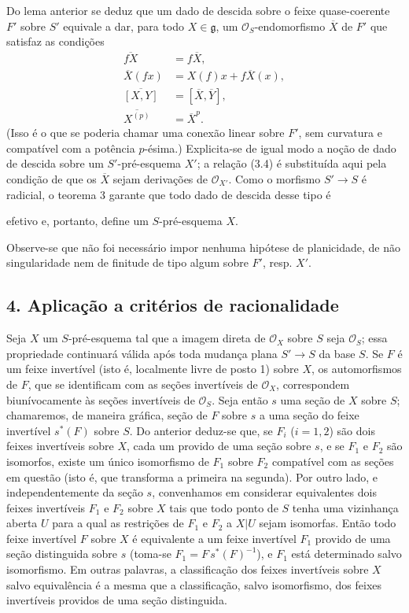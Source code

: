 Do lema anterior se deduz que um dado de descida sobre o feixe
quase-coerente $F'$ sobre $S'$ equivale a dar, para todo $X\in\mathfrak g$, um
$\mathcal O_S$-endomorfismo $\overline X$ de $F'$ que satisfaz as condições
\begin{align}
  \overline{fX}&=f\overline X, \tag{3.7}\\
  \overline X(fx)&=X(f)x+f\overline X(x), \tag{3.8}\\
  \overline{[X,Y]}&=[\overline X,\overline Y], \tag{3.9}\\
  \overline{X^{(p)}}&=\overline X^p. \tag{3.10}
\end{align}
(Isso é o que se poderia chamar uma conexão linear sobre $F'$, sem curvatura
e compatível com a potência $p$-ésima.) Explicita-se de igual modo a noção
de dado de descida sobre um $S'$-pré-esquema $X'$; a relação (3.4) é
substituída aqui pela condição de que os $\overline X$ sejam derivações de
$\mathcal O_{X'}$. Como o morfismo $S'\longrightarrow S$ é radicial, o
teorema 3 garante que todo dado de descida desse tipo é

efetivo e, portanto, define um $S$-pré-esquema $X$.

Observe-se que não foi necessário impor nenhuma hipótese de planicidade, de
não singularidade nem de finitude de tipo algum sobre $F'$, resp. $X'$.

\subsection*{4. Aplicação a critérios de racionalidade}

Seja $X$ um $S$-pré-esquema tal que a imagem direta de $\mathcal O_X$ sobre
$S$ seja $\mathcal O_S$; essa propriedade continuará válida após toda mudança
plana $S'\longrightarrow S$ da base $S$. Se $F$ é um feixe invertível
(isto é, localmente livre de posto 1) sobre $X$, os automorfismos de $F$, que se
identificam com as seções invertíveis de $\mathcal O_X$, correspondem
biunívocamente às seções invertíveis de $\mathcal O_S$. Seja então $s$
uma seção de $X$ sobre $S$; chamaremos, de maneira gráfica, seção de $F$
sobre $s$ a uma seção do feixe invertível $s^*(F)$ sobre $S$. Do anterior
deduz-se que, se $F_i$ ($i=1,2$) são dois feixes invertíveis sobre $X$, cada um
provido de uma seção sobre $s$, e se $F_1$ e $F_2$ são isomorfos, existe um
único isomorfismo de $F_1$ sobre $F_2$ compatível com as seções em questão
(isto é, que transforma a primeira na segunda). Por outro lado, e
independentemente da seção $s$, convenhamos em considerar equivalentes
dois feixes invertíveis $F_1$ e $F_2$ sobre $X$ tais que todo ponto de $S$ tenha
uma vizinhança aberta $U$ para a qual as restrições de $F_1$ e $F_2$ a
$X|U$ sejam isomorfas. Então todo feixe invertível $F$ sobre $X$ é equivalente
a um feixe invertível $F_1$ provido de uma seção distinguida sobre $s$
(toma-se $F_1=F\,s^*(F)^{-1}$), e $F_1$ está determinado salvo isomorfismo. Em
outras palavras, a classificação dos feixes invertíveis sobre $X$ salvo
equivalência é a mesma que a classificação, salvo isomorfismo, dos feixes
invertíveis providos de uma seção distinguida.

